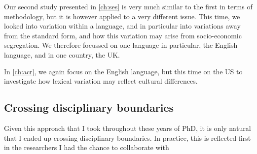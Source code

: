 \documentclass[../thesis.tex]{subfiles}
\begin{document}
Our second study presented in \cref{ch:ses} is very much similar to the first in terms
of methodology, but it is however applied to a very different issue. This time, we
looked into variation within a language, and in particular into variations away from the
standard form, and how this variation may arise from socio-economic segregation. We therefore focussed on one language in particular, the English language, and in one country, the UK. 

In \cref{ch:acr}, we again focus on the English language, but this time on the US to
investigate how lexical variation may reflect cultural differences. 





\subsection{Crossing disciplinary boundaries}
Given this approach that I took throughout these years of PhD, it is only natural that I ended up crossing disciplinary boundaries. In practice, this is reflected first in the researchers I had the chance to collaborate with
\end{document}
